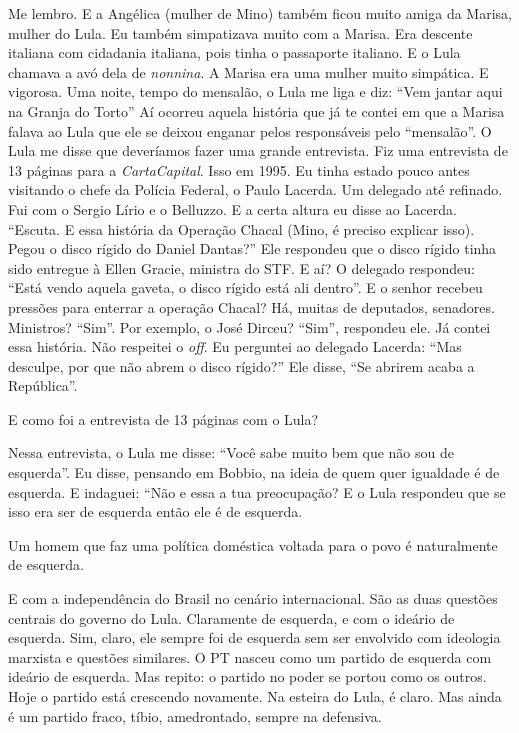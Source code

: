 \falaM Me lembro. E a Angélica (mulher de Mino) também ficou muito amiga da
Marisa, mulher do Lula. Eu também simpatizava muito com a Marisa. Era
descente italiana com cidadania italiana, pois tinha o passaporte
italiano. E o Lula chamava a avó dela de \emph{nonnina}. A Marisa era
uma mulher muito simpática. E vigorosa. Uma noite, tempo do mensalão, o
Lula me liga e diz: ``Vem jantar aqui na Granja do Torto'' Aí ocorreu
aquela história que já te contei em que a Marisa falava ao Lula que ele
se deixou enganar pelos responsáveis pelo ``mensalão''. O Lula me disse
que deveríamos fazer uma grande entrevista. Fiz uma entrevista de 13
páginas para a \emph{CartaCapital}. Isso em 1995. Eu tinha estado pouco
antes visitando o chefe da Polícia Federal, o Paulo Lacerda. Um delegado
até refinado. Fui com o Sergio Lírio e o Belluzzo. E a certa altura eu
disse ao Lacerda. ``Escuta. E essa história da Operação Chacal (Mino, é
preciso explicar isso). Pegou o disco rígido do Daniel Dantas?'' Ele
respondeu que o disco rígido tinha sido entregue à Ellen Gracie,
ministra do STF. E aí? O delegado respondeu: ``Está vendo aquela gaveta,
o disco rígido está ali dentro''. E o senhor recebeu pressões para
enterrar a operação Chacal? Há, muitas de deputados, senadores.
Ministros? ``Sim''. Por exemplo, o José Dirceu? ``Sim'', respondeu ele.
Já contei essa história. Não respeitei o \emph{off}. Eu perguntei ao
delegado Lacerda: ``Mas desculpe, por que não abrem o disco rígido?''
Ele disse, ``Se abrirem acaba a República''.

\falaG E como foi a entrevista de 13 páginas com o Lula?

\falaM Nessa entrevista, o Lula me disse: ``Você sabe muito bem que não sou
de esquerda''. Eu disse, pensando em Bobbio, na ideia de quem quer
igualdade é de esquerda. E indaguei: ``Não e essa a tua preocupação? E o
Lula respondeu que se isso era ser de esquerda então ele é de esquerda.

\falaG Um homem que faz uma política doméstica voltada para o povo é
naturalmente de esquerda.

\falaM E com a independência do Brasil no cenário internacional. São as duas
questões centrais do governo do Lula. Claramente de esquerda, e com o
ideário de esquerda. Sim, claro, ele sempre foi de esquerda sem ser
envolvido com ideologia marxista e questões similares. O PT nasceu como
um partido de esquerda com ideário de esquerda. Mas repito: o partido no
poder se portou como os outros. Hoje o partido está crescendo novamente.
Na esteira do Lula, é claro. Mas ainda é um partido fraco, tíbio,
amedrontado, sempre na defensiva.

